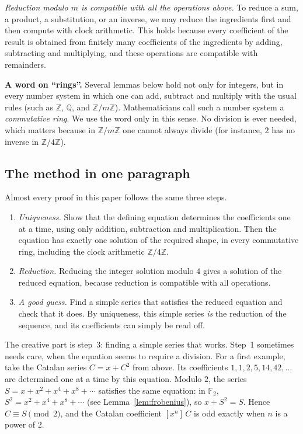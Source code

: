 \documentclass[11pt,a4paper]{article}
\theoremstyle{definition}
\theoremstyle{remark}
\newcommand{\Z}{\mathbb{Z}}
\newcommand{\Q}{\mathbb{Q}}
\newcommand{\F}{\mathbb{F}}
\newcommand{\coeff}[2]{[x^{#1}]\,#2}
\newcommand{\para}[1]{\par\medskip\noindent\textbf{#1}\enspace}
\begin{document}
\emph{Reduction modulo $m$ is compatible with all the operations above.} To reduce a sum, a product, a substitution, or
an inverse, we may reduce the ingredients first and then compute with clock arithmetic. This holds because every
coefficient of the result is obtained from finitely many coefficients of the ingredients by adding, subtracting and
multiplying, and these operations are compatible with remainders.

\para{A word on ``rings''.} Several lemmas below hold not only for integers, but in every number system in
which one can add, subtract and multiply with the usual rules (such as $\Z$, $\Q$, and $\Z/m\Z$). Mathematicians call
such a number system a \emph{commutative ring}. We use the word only in this sense. No division is ever needed, which
matters because in $\Z/m\Z$ one cannot always divide (for instance, $2$ has no inverse in $\Z/4\Z$).

\subsection{The method in one paragraph}
Almost every proof in this paper follows the same three steps.
\begin{enumerate}
\item \emph{Uniqueness.} Show that the defining equation determines the coefficients one at a time, using only
addition, subtraction and multiplication. Then the equation has exactly one solution of the required shape, in every
commutative ring, including the clock arithmetic $\Z/4\Z$.
\item \emph{Reduction.} Reducing the integer solution modulo $4$ gives a solution of the reduced equation,
because reduction is compatible with all operations.
\item \emph{A good guess.} Find a simple series that satisfies the reduced equation and check that it does. By uniqueness,
this simple series \emph{is} the reduction of the sequence, and its coefficients can simply be read off.
\end{enumerate}
The creative part is step~3: finding a simple series that works. Step~1 sometimes needs care, when the equation seems to
require a division.
For a first example, take the Catalan series $C=x+C^2$ from above. Its coefficients $1,1,2,5,14,42,\dots$ are
determined one at a time by this equation. Modulo $2$, the series $S=x+x^2+x^4+x^8+\cdots$ satisfies the same
equation: in $\F_2$, $S^2=x^2+x^4+x^8+\cdots$ (see Lemma~\ref{lem:frobenius}), so $x+S^2=S$. Hence $C\equiv S\pmod2$,
and the Catalan coefficient $\coeff{n}{C}$ is odd exactly when $n$ is a power of $2$.
\end{document}
